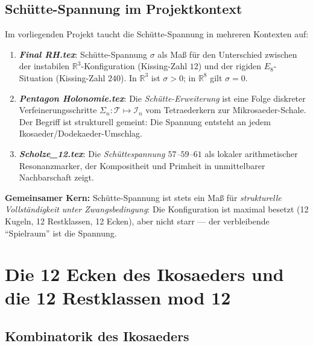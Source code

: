 \documentclass[12pt,a4paper]{article}
\newcommand{\R}{\mathbb{R}}
\begin{document}
\subsection{Schütte-Spannung im Projektkontext}

Im vorliegenden Projekt taucht die Schütte-Spannung in mehreren Kontexten auf:

\begin{enumerate}[label=(\alph*)]
  \item \textbf{\textit{Final RH.tex}}: Schütte-Spannung $\sigma$ als Maß
        für den Unterschied zwischen der instabilen $\R^3$-Konfiguration
        (Kissing-Zahl $12$) und der rigiden $E_8$-Situation (Kissing-Zahl
        $240$). In $\R^3$ ist $\sigma > 0$; in $\R^8$ gilt $\sigma = 0$.

  \item \textbf{\textit{Pentagon Holonomie.tex}}: Die
        \emph{Schütte-Erweiterung} ist eine Folge diskreter
        Verfeinerungsschritte $\Sigma_n: \mathcal{T} \mapsto \mathcal{I}_n$
        vom Tetraederkern zur Mikrosaeder-Schale. Der Begriff ist strukturell
        gemeint: Die Spannung entsteht an jedem Ikosaeder/Dodekaeder-Umschlag.

  \item \textbf{\textit{Scholze\_12.tex}}: Die
        \emph{Schüttespannung $57$--$59$--$61$} als lokaler arithmetischer
        Resonanzmarker, der Kompositheit und Primheit in unmittelbarer
        Nachbarschaft zeigt.
\end{enumerate}

\begin{tcolorbox}[ikosaeder]
\textbf{Gemeinsamer Kern:}
Schütte-Spannung ist stets ein Maß für \emph{strukturelle Vollständigkeit
unter Zwangsbedingung}: Die Konfiguration ist maximal besetzt (12 Kugeln,
12 Restklassen, 12 Ecken), aber nicht starr --- der verbleibende
``Spielraum'' ist die Spannung.
\end{tcolorbox}

\section{Die 12 Ecken des Ikosaeders und die 12 Restklassen mod 12}
\label{sec:zwolf}

\subsection{Kombinatorik des Ikosaeders}
\end{document}
